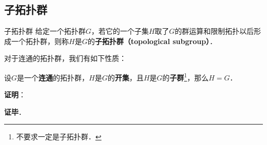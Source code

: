 \subsection{子拓扑群}

\begin{definition}{子拓扑群}
给定一个拓扑群$G$，若它的一个子集$H$取了$G$的群运算和限制拓扑以后形成一个拓扑群，则称$H$是$G$的\textbf{子拓扑群（topological subgroup）}．
\end{definition}

对于连通的拓扑群，我们有如下性质：

\begin{theorem}{}
设$G$是一个\textbf{连通}的拓扑群，$H$是$G$的\textbf{开集}，且$H$是$G$的\textbf{子群}\footnote{不要求一定是子拓扑群．}，那么$H=G$．
\end{theorem}

\textbf{证明}：



\textbf{证毕}．




